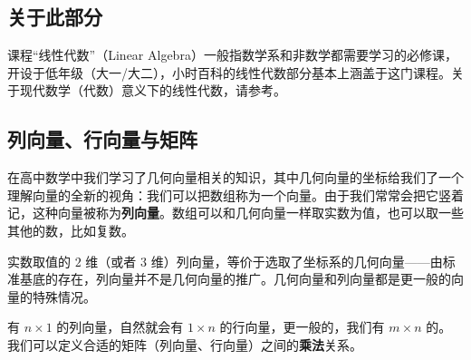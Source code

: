 
\begin{issues}
\issueDraft
\end{issues}

\subsection{关于此部分}

课程“线性代数”（Linear Algebra）一般指数学系和非数学都需要学习的必修课，开设于低年级（大一/大二），小时百科的线性代数部分基本上涵盖于这门课程。关于现代数学（代数）意义下的线性代数，请参考。



\subsection{列向量、行向量与矩阵}

在高中数学中我们学习了几何向量相关的知识，其中几何向量的坐标给我们了一个理解向量的全新的视角：我们可以把数组称为一个向量。由于我们常常会把它竖着记，这种向量被称为\textbf{列向量}。数组可以和几何向量一样取实数为值，也可以取一些其他的数，比如复数。


实数取值的 $2$ 维（或者 $3$ 维）列向量，等价于选取了坐标系的几何向量——由标准基底的存在，列向量并不是几何向量的推广。几何向量和列向量都是更一般的向量的特殊情况。


有 $n \times 1$ 的列向量，自然就会有 $1 \times n$ 的行向量，更一般的，我们有 $m \times n$ 的。我们可以定义合适的矩阵（列向量、行向量）之间的\textbf{乘法}关系。






